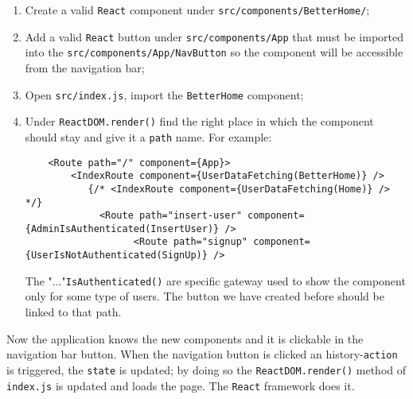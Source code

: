 \begin{enumerate}
	\item Create a valid \verb|React| component under \verb|src/components/BetterHome/|;
	\item Add a valid \verb|React| button under \verb|src/components/App| that must be imported into the \verb|src/components/App/NavButton| so the component will be accessible from the navigation bar;
	\item Open \verb|src/index.js|, import the \verb|BetterHome| component;
	\item Under \verb|ReactDOM.render()| find the right place in which the component should stay and give it a \verb|path| name. For example:
	\begin{lstlisting}
	<Route path="/" component={App}>
	    <IndexRoute component={UserDataFetching(BetterHome)} />
	       {/* <IndexRoute component={UserDataFetching(Home)} /> */}
	         <Route path="insert-user" component={AdminIsAuthenticated(InsertUser)} />
	               <Route path="signup" component={UserIsNotAuthenticated(SignUp)} />
	\end{lstlisting}
	The "..."\verb|IsAuthenticated()| are specific gateway used to show the component only for some type of users. The button we have created before should be linked to that path.
\end{enumerate}

Now the application knows the new components and it is clickable in the navigation bar button. When the navigation button is clicked an history-\verb|action| is triggered, the \verb|state| is updated; by doing so the \verb|ReactDOM.render()| method of \verb|index.js| is updated and loads the page. The \verb|React| framework does it.

